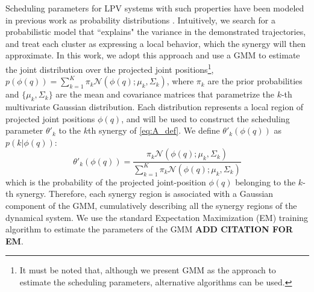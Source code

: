 \documentclass[letterpaper, 10 pt, conference,fleqn]{ieeeconf}
\begin{document}
Scheduling parameters for LPV systems with such properties have been modeled in previous work as probability distributions \cite{7439839, Salehian-RSS-16}. Intuitively, we search for a probabilistic model that ``explains" the variance in the demonstrated trajectories, and treat each cluster as expressing a local behavior, which the synergy will then approximate. In this work, we adopt this approach and use a GMM to estimate the joint distribution over the projected joint positions\footnote{It must be noted that, although we present GMM as the approach to estimate the scheduling parameters, alternative algorithms can be used.}, $p(\phi(q)) = \sum_{k=1}^K\pi_k\mathcal{N}(\phi(q);\mu_k,\Sigma_k)$, where $\pi_k$ are the prior probabilities and $\{\mu_k,\Sigma_k\}$ are the mean and covariance matrices that parametrize the $k$-th multivariate Gaussian distribution. Each distribution represents a local region of projected joint positions $\phi(q)$, and will be used to construct the scheduling parameter $\theta'_k$ to the $k$th synergy of \eqref{eq:A_def}. We define $\theta'_k(\phi(q))$ as $p(k|\phi(q))$:
\begin{equation}
\label{eq:theta}
\theta'_k(\phi(q))= \frac{\pi_k\mathcal{N} (\phi(q); \mu_k, \Sigma_k)}{\sum_{k=1}^K \pi_k\mathcal{N} (\phi(q); \mu_k, \Sigma_k)}
\end{equation}
which is the probability of the projected joint-position $\phi(q)$ belonging to the $k$-th synergy. Therefore, each synergy region is associated with a Gaussian component of the GMM, cumulatively describing all the synergy regions of the dynamical system. We use the standard Expectation Maximization (EM) training algorithm to estimate the parameters of the GMM \textbf{ADD CITATION FOR EM}.
\end{document}
